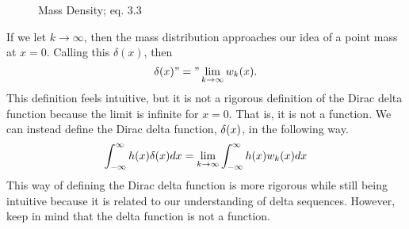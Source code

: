 \begin{figure}
    \centering
    \caption{Mass Density;  eq. 3.3}
\end{figure}

If we let \(k \rightarrow \infty\), then the mass distribution approaches our idea of a point mass at \(x=0\). Calling this \(\delta(x)\), then
\begin{equation} \label{eq:deltaSeqLim}
    \delta(x) "=" \lim_{k\rightarrow \infty} w_k(x).
\end{equation}
This definition feels intuitive, but it is not a rigorous definition of the Dirac delta function because the limit is infinite for \(x=0\). That is, it is not a function. We can instead define the Dirac delta function, \(\delta(x)\), in the following way.
\begin{equation}
    \int_{-\infty}^{\infty} h(x)\delta(x)dx = \lim_{k\rightarrow \infty}\int_{-\infty}^{\infty} h(x)w_k(x)dx
\end{equation}
This way of defining the Dirac delta function is more rigorous while still being intuitive because it is related to our understanding of delta sequences. However, keep in mind that the delta function is not a function.

